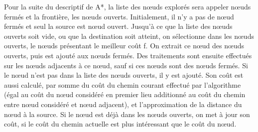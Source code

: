 \documentclass[pidr]{tnreport}
\begin{document}
Pour la suite du descriptif de A*, la liste des nœuds explorés sera appeler nœuds fermés et la frontière, les nœuds ouverts. Initialement, il n'y a pas de nœud fermés et seul la source est nœud ouvert. Jusqu'à ce que la liste des nœuds ouverts soit vide, ou que la destination soit atteint, on sélectionne dans les nœuds ouverts, le nœuds présentant le meilleur coût f. On extrait ce nœud des nœuds ouverts, puis est ajouté aux nœuds fermés. Des traitements sont ensuite effectués sur les nœuds adjacents à ce nœud, sauf si ces nœuds sont des nœuds fermés. Si le nœud n'est pas dans la liste des nœuds ouverts, il y est ajouté. Son coût est aussi calculé, par somme du coût du chemin courant effectué par l'algorithme (égal au coût du nœud considéré en premier lieu additionné au coût du chemin entre nœud considéré et nœud adjacent), et l'approximation de la distance du nœud à la source. Si le nœud est déjà dans les nœuds ouverts, on met à jour son coût, si le coût du chemin actuelle est plus intéressant que le coût du nœud.
\end{document}
